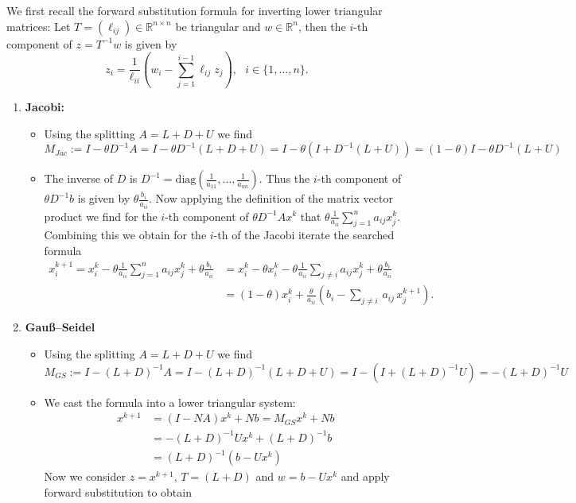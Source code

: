 {\color{solution}
{\color{navy}
We first recall the forward substitution formula for inverting lower triangular matrices: Let $T = (\ell_{ij})\in\mathbb{R}^{n \times n}$ be triangular and $w \in \mathbb{R}^n$, then the $i$-th component of $z=T^{-1}w$ is given by
$$z_i =\frac{1}{\ell_{ii}}\left(w_i-\sum_{j=1}^{i-1}\ell_{ij}z_j\right),~~~i\in\{1,\ldots,n\}.$$

}
\begin{enumerate}
	\item \textbf{Jacobi:}
	\begin{itemize}
		\item Using the splitting $A=L+D+U$ we find
		$$M_{Jac} := I-\theta D^{-1}A = I-\theta D^{-1}(L+D+U)=I-\theta(I + D^{-1}(L+U))= (1-\theta)I - \theta D^{-1}(L+U)$$
		\item The inverse of $D$ is $D^{-1}= \text{diag}(\frac{1}{a_{11}},\ldots, \frac{1}{a_{nn}})$. Thus the $i$-th component of $\theta D^{-1} b$ is given by 
		$\theta \frac{b_i}{a_{ii}} .$ 
		Now applying the definition of the matrix vector product we find for the $i$-th component of $\theta D^{-1}A x^k  $ that
		$\theta \frac{1}{a_{ii}} \sum_{j=1}^n a_{ij}x^k_j $. Combining this we obtain for the $i$-th of the Jacobi iterate the searched formula
		\begin{align*}
		x_{i}^{k+1}= x_i^k -\theta \frac{1}{a_{ii}} \sum_{j=1}^n a_{ij}x^k_j  + \theta \frac{b_i}{a_{ii}}  
		&= x_i^k -\theta x_i^k  -\theta\frac{1}{a_{ii}} \sum_{j\neq i}  a_{ij}x^k_j  + \theta \frac{b_i}{a_{ii}}\\
		&= (1-\theta)x_i^k +  \frac{\theta}{a_{ii}}\left( b_i - \sum_{j\neq i} \,a_{ij} \, x_j^{k+1}\right).
		\end{align*}
	\end{itemize}
	\item \textbf{Gauß--Seidel}
	\begin{itemize}
		\item Using the splitting $A=L+D+U$ we find
		$$M_{GS} := I- (L+D)^{-1}A = I- (L+D)^{-1}(L+D+U) =   I- (I+(L+D)^{-1} U)   =     -(L+D)^{-1}U$$
		\item We cast the formula into a lower triangular system:
		\begin{align*}
		 x^{k+1} &=  (I-NA)x^k + Nb   =M_{GS}x^k + Nb\\
		 & =-(L+D)^{-1}Ux^k + (L+D)^{-1}b\\
		 & = (L+D)^{-1}(b-Ux^k)
		\end{align*}
		Now we consider $z= x^{k+1}$, $T=(L+D)$ and $w = b-Ux^k$ and apply forward substitution to obtain

\end{itemize}
\end{enumerate}}
